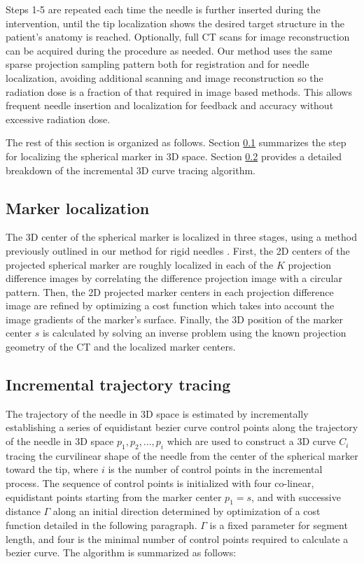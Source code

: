 \documentclass[letterpaper, 11 pt, conference]{ieeeconf} %
\begin{document}
Steps 1-5 are repeated each time the needle is further inserted during the intervention, until the tip localization shows the desired target structure in the patient's anatomy is reached. Optionally, full CT scans for image reconstruction can be acquired during the procedure as needed. Our method uses the same sparse projection sampling pattern both for registration and for needle localization, avoiding additional scanning and image reconstruction so the radiation dose is a fraction of that required in image based methods. This allows frequent needle insertion and localization for feedback and accuracy without excessive radiation dose.

The rest of this section is organized as follows.
Section \ref{markerloc} summarizes the step for localizing the spherical marker in 3D space.
Section \ref{inctracing} provides a detailed breakdown of the incremental 3D curve tracing algorithm.

\subsection{Marker localization} \label{markerloc}
The 3D center of the spherical marker is localized in three stages, using a method previously outlined in our method for rigid needles \cite{medan2017reduced}. 
First, the 2D centers of the projected spherical marker are roughly localized in each of the $K$ projection difference images by correlating the difference projection image with a circular pattern. 
Then, the 2D projected marker centers in each projection difference image are refined by optimizing a cost function which takes into account the image gradients of the marker's surface.
Finally, the 3D position of the marker center $s$ is calculated by solving an inverse problem using the known projection geometry of the CT and the localized marker centers.

\subsection{Incremental trajectory tracing} \label{inctracing}

The trajectory of the needle in 3D space is estimated by incrementally establishing a series of equidistant bezier curve control points along the trajectory of the needle in 3D space $p_1, p_2, ..., p_i$ which are used to construct a 3D curve $C_i$ tracing the curvilinear shape of the needle from the center of the spherical marker toward the tip, where $i$ is the number of control points in the incremental process. The sequence of control points is initialized with four co-linear, equidistant points starting from the marker center $p_1=s$, and with successive distance $\Gamma$ along an initial direction determined by optimization of a cost function detailed in the following paragraph. $\Gamma$ is a fixed parameter for segment length, and four is the minimal number of control points required to calculate a bezier curve. The algorithm is summarized as follows:
\end{document}
